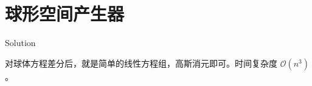 \section{球形空间产生器}

\begin{frame}{Solution}

对球体方程差分后，就是简单的线性方程组，高斯消元即可。时间复杂度 $\mathcal O(n^3)$。

\end{frame}